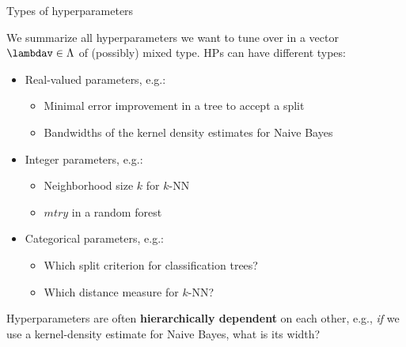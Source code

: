 \begin{vbframe}{Types of hyperparameters}

We summarize all hyperparameters we want to tune over in a vector $\lambdav \in \Lambda$ of (possibly) mixed type. HPs can have different types: 

\begin{itemize}
\item Real-valued parameters, e.g.:
\begin{itemize}
\item Minimal error improvement in a tree to accept a split
\item Bandwidths of the kernel density estimates for Naive Bayes 
\end{itemize}
\item Integer parameters, e.g.:
\begin{itemize}
\item Neighborhood size $k$ for $k$-NN
\item $mtry$ in a random forest
\end{itemize}
\item Categorical parameters, e.g.:
\begin{itemize}
\item Which split criterion for classification trees?
\item Which distance measure for $k$-NN?
\end{itemize}
\end{itemize}

Hyperparameters are often \textbf{hierarchically dependent} on each other, e.g., \emph{if} we use 
a kernel-density estimate for Naive Bayes, what is its width? 
\end{vbframe}


\endlecture


